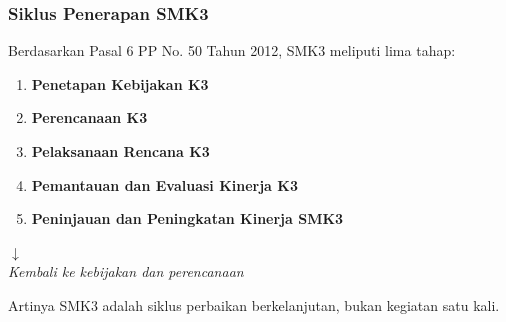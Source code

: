 \documentclass[../main.tex]{subfiles}
\begin{document}
\begin{frame}[mytitle=standard,c,mycolor=digiPH_uniblue!15]
	\frametitle{Siklus Penerapan SMK3}

	Berdasarkan Pasal 6 PP No. 50 Tahun 2012, SMK3 meliputi lima tahap:

	\begin{enumerate}
		\item \textbf{Penetapan Kebijakan K3}
		\item \textbf{Perencanaan K3}
		\item \textbf{Pelaksanaan Rencana K3}
		\item \textbf{Pemantauan dan Evaluasi Kinerja K3}
		\item \textbf{Peninjauan dan Peningkatan Kinerja SMK3}
	\end{enumerate}

	\begin{center}
		$\downarrow$\\
		\textit{Kembali ke kebijakan dan perencanaan}
	\end{center}

	\begin{exampleblock}{Artinya}
		SMK3 adalah siklus perbaikan berkelanjutan, bukan kegiatan satu kali.
	\end{exampleblock}
\end{frame}
\end{document}
